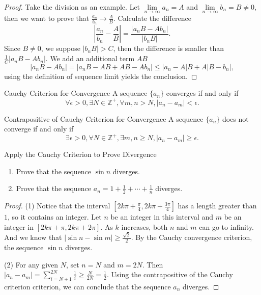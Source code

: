 \begin{proof}
  Take the division as an example. Let $\lim \limits _{n \rightarrow \infty} a_n
  = A$ and $\lim \limits _{n \rightarrow \infty} b_n = B \neq 0$, then we
  want to prove that $\frac{a_n}{b_n} \rightarrow \frac{A}{B}$.
  Calculate the difference
  \begin{equation}
    \left|  \frac{a_n}{b_n} - \frac{A}{B}\right| = \frac{|a_nB - Ab_n|}{|b_n B|}.
  \end{equation}
  Since $B \neq 0$, we suppose $|b_n B| > C$,
  then the difference is smaller than $\frac{1}{C} |a_n B - Ab_n|$.
  We add an additional term $AB$
  \begin{equation}
    |a_n B - Ab_n| = |a_n B - AB + AB - Ab_n| \leq |a_n - A|B + A|B - b_n|,
  \end{equation}
  using the definition of sequence limit yields the conclusion.
\end{proof}

\begin{theorem}{Cauchy Criterion for Convergence}{}
  A sequence $\{a_n\}$ converges if and only if
  \begin{equation}
    \forall \epsilon > 0, \exists N \in \mathbb{Z}^+, \forall m,n > N, |a_n - a_m| < \epsilon.
  \end{equation}
\end{theorem}

\begin{corollary}{Contrapositive of Cauchy Criterion for Convergence}{}
  A sequence $\{a_n\}$ does not converge if and only if
  \begin{equation}
    \exists \epsilon > 0, \forall N \in \mathbb{Z}^+, \exists m, n \geq N, |a_n - a_m| \geq \epsilon.
  \end{equation}
\end{corollary}

\begin{example}{Apply the Cauchy Criterion to Prove Divergence}{}
  \begin{enumerate}
  \item Prove that the sequence $\sin n$ diverges.
  \item Prove that the sequence $a_n = 1 + \frac{1}{2} + \cdots + \frac{1}{n}$ diverges.
  \end{enumerate}
\end{example}

\begin{proof}
  (1) Notice that the interval $[2k\pi + \frac{\pi}{4}, 2k\pi + \frac{3\pi}{4}]$
  has a length greater than $1$, so it contains an integer.
  Let $n$ be an integer in this interval
  and $m$ be an integer in $[2k\pi + \pi, 2k\pi + 2\pi]$.
  As $k$ increases, both $n$ and $m$ can go to infinity.
  And we know that $|\sin n - \sin m| \geq \frac{\sqrt{2}}{2}$.
  By the Cauchy convergence criterion, the sequence $\sin n$ diverges.

  (2) For any given $N$, set $n = N$ and $m = 2N$.
  Then $|a_n - a_m| = \sum\limits_{i = N + 1}^{2N} \frac{1}{i} \geq \frac{N}{2N}
  = \frac{1}{2}$.
  Using the contrapositive of the Cauchy criterion criterion,
  we can conclude that the sequence $a_n$ diverges.
\end{proof}

